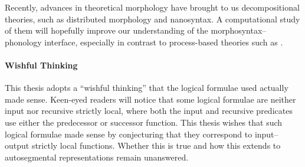 \documentclass[12pt, a4paper]{report}
\begin{document}
Recently, advances in theoretical morphology have brought to us
decompositional theories, such as  distributed
morphology and  nanosyntax.  A computational study of
them will hopefully improve our understanding of the
morphosyntax--phonology interface, especially in contrast to
process-based theories such as \textcite{a92am}.

\paragraph{Wishful Thinking}
This thesis adopts a \enquote{wishful thinking} that the logical
formulae used actually made sense.  Keen-eyed readers will notice that
some logical formulae are neither input nor recursive strictly local,
where both the input and recursive predicates use either the
predecessor or successor function.  This thesis wishes that such
logical formulae made sense by conjecturing that they correspond to
input--output strictly local functions.  Whether this is true and how
this extends to autosegmental representations remain unanswered.

\printbibliography[heading=bibintoc]

\printindex
\end{document}
